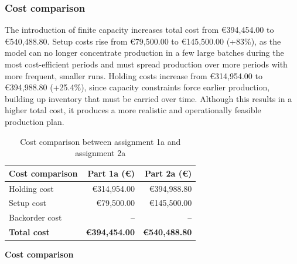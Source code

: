 \documentclass[a4paper,faculty=eb,language=en,doctype=article,sftitles=false]{ugent-doc}
\begin{document}
\subsubsection{Cost comparison}

The introduction of finite capacity increases total cost from €394{,}454.00 to €540{,}488.80. Setup costs rise from €79{,}500.00 to €145{,}500.00 (+83\%), as the model can no longer concentrate production in a few large batches during the most cost-efficient periods and must spread production over more periods with more frequent, smaller runs. Holding costs increase from €314{,}954.00 to €394{,}988.80 (+25.4\%), since capacity constraints force earlier production, building up inventory that must be carried over time. Although this results in a higher total cost, it produces a more realistic and operationally feasible production plan.

\begin{table}[H]
\centering
\begin{minipage}[c]{0.44\textwidth}
\centering
\begin{tabular}{lrr}
\toprule
\textbf{Cost comparison} & \textbf{Part 1a (€)} & \textbf{Part 2a (€)} \\
\midrule
Holding cost   & €314{,}954.00 & €394{,}988.80 \\
Setup cost     & €79{,}500.00  & €145{,}500.00 \\
Backorder cost & --            & -- \\
\midrule
\textbf{Total cost} & \textbf{€394{,}454.00} & \textbf{€540{,}488.80} \\
\bottomrule
\end{tabular}
\end{minipage}
\hspace{0.06\textwidth}
\begin{minipage}[c]{0.44\textwidth}
\centering
\textbf{Cost comparison}

\vspace{0.3em}
\end{minipage}
\caption{Cost comparison between assignment 1a and assignment 2a}
\end{table}
\end{document}
